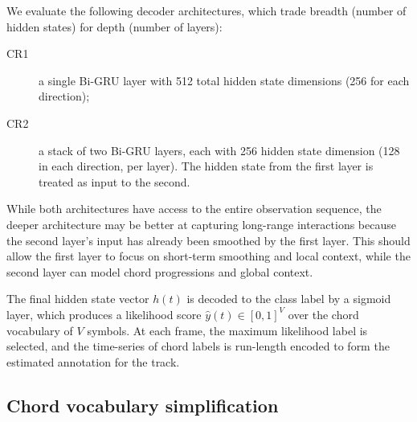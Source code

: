 \documentclass{article}
\begin{document}
We evaluate the following decoder architectures, which trade breadth (number of hidden states) for depth (number of layers):
\begin{description}
    \item[CR1] a single Bi-GRU layer with 512 total hidden state dimensions (256 for each direction);
    \item[CR2] a stack of two Bi-GRU layers, each with 256 hidden state dimension (128 in each direction, per layer). The hidden state from the first layer is treated as input to the second.
\end{description}
While both architectures have access to the entire observation sequence, the deeper architecture may be better at capturing long-range interactions because the second layer's input has already been smoothed by the first layer.
This should allow the first layer to focus on short-term smoothing and local context, while the second layer can model chord progressions and global context.

The final hidden state vector $h(t)$ is decoded to the class label by a sigmoid layer, which produces a likelihood score $\hat{y}(t) \in [0, 1]^{V}$ over the chord vocabulary of $V$ symbols.
At each frame, the maximum likelihood label is selected, and the time-series of chord labels is run-length encoded to form the estimated annotation for the track.


\subsection{Chord vocabulary simplification}

\label{sec:vocab}
%
\end{document}
